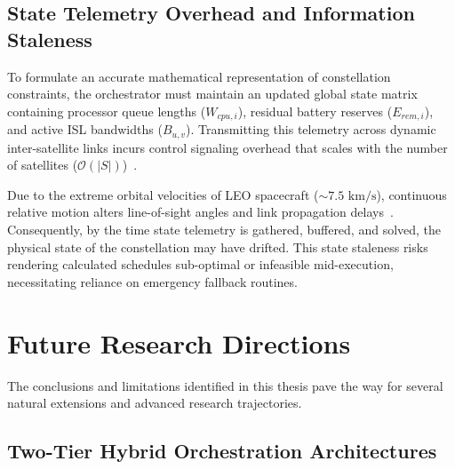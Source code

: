 \subsection{State Telemetry Overhead and Information Staleness}
\label{subsec:limitations_staleness}

To formulate an accurate mathematical representation of constellation constraints, the orchestrator must maintain an updated global state matrix containing processor queue lengths ($W_{cpu,i}$), residual battery reserves ($E_{rem,i}$), and active ISL bandwidths ($B_{u,v}$). Transmitting this telemetry across dynamic inter-satellite links incurs control signaling overhead that scales with the number of satellites ($\mathcal{O}(|S|)$)~\cite{survey_orbital_edge_2023}. 

Due to the extreme orbital velocities of LEO spacecraft ($\sim 7.5\text{ km/s}$), continuous relative motion alters line-of-sight angles and link propagation delays~\cite{chen2021isl}. Consequently, by the time state telemetry is gathered, buffered, and solved, the physical state of the constellation may have drifted. This state staleness risks rendering calculated schedules sub-optimal or infeasible mid-execution, necessitating reliance on emergency fallback routines.

\section{Future Research Directions}
\label{sec:concl_future_work}

The conclusions and limitations identified in this thesis pave the way for several natural extensions and advanced research trajectories.

\subsection{Two-Tier Hybrid Orchestration Architectures}
\label{subsec:future_hybrid}

